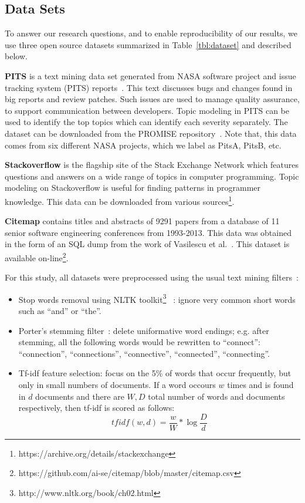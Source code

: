 \documentclass[10pt,conference]{IEEEtran}
\newcommand{\bi}{\begin{itemize}}
\newcommand{\ei}{\end{itemize}}
\theoremstyle{break}
\begin{document}
\subsection{Data Sets}
To answer our research questions, and to enable reproducibility of our results,
we use three open source datasets summarized in Table~\ref{tbl:dataset} and described
below.

\textbf{PITS} is a text mining data set generated from NASA software project
and issue tracking system (PITS) reports~\cite{menzies2008improving,
  menzies2008automated}. This text discusses
bugs and changes found in big reports and  review patches.
Such issues are used
to manage quality assurance, to support communication
between developers. Topic modeling in PITS can be used
to identify the top topics which can
identify each severity separately. The dataset can be downloaded from the
PROMISE
repository~\cite{promiserepo}. Note that, this data comes from six different
NASA projects, which we label as PitsA, PitsB, etc.
    
 \textbf{Stackoverflow} is the flagship site of the Stack Exchange Network which
 features questions and answers on a wide range of topics in computer
 programming.
Topic modeling on Stackoverflow is useful for finding patterns in programmer knowledge.
 This data can be downloaded from various
 sources\footnote{https://archive.org/details/stackexchange}. 
    
  \textbf{Citemap} contains titles and abstracts of 9291 papers from a
 database of 11 senior software engineering conferences from 1993-2013. This data was
 obtained in the form of an SQL dump from the work of Vasilescu et
 al.~\cite{vasilescu2013historical}.  This dataset is available on-line\footnote{https://github.com/ai-se/citemap/blob/master/citemap.csv}.

  For this study, all  datasets were preprocessed using the usual text mining filters~\cite{feldman2006j}:
\bi
\item
  Stop words removal using NLTK toolkit\footnote{http://www.nltk.org/book/ch02.html}~\cite{bird2006nltk} : ignore very common short words such as  ``and'' or ``the''.
\item
  Porter's stemming filter~\cite{Porter1980}: delete uniformative word endings; e.g. after stemming, all the following words would be rewritten
  to ``connect'': ``connection'', ``connections'',
``connective'',          
``connected'',
  ``connecting''.
\item
  Tf-idf feature selection: focus on the 5\% of words that occur frequently,
  but only in small numbers of documents. If a word occours $w$ times
  and is found in $d$ documents  and there
  are $W,D$ total number of words and documents respectively, then tf-idf is scored
  as follows:
  \[
  \mathit{tfidf}(w,d)=   \frac{w}{W} *\log{\frac{D}{d}}\]
  \ei
\end{document}
